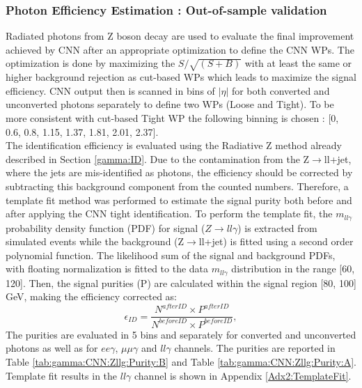 
\subsubsection{Photon Efficiency Estimation : Out-of-sample validation}
\label{gamma:CNN:Zllg}
Radiated photons from Z boson decay are used to evaluate the final improvement achieved by CNN after an appropriate optimization to define the CNN WPs. The optimization is done by maximizing the $S/\sqrt{(S+B)}$ with at least the same or higher background rejection as cut-based WPs which leads to maximize the signal efficiency. CNN output then is scanned in bins of $|\eta|$ for both converted and unconverted photons separately to define two WPs (Loose and Tight). To be more consistent with cut-based Tight WP the following binning is chosen : [0, 0.6, 0.8, 1.15, 1.37, 1.81, 2.01, 2.37]. \\
The identification efficiency is evaluated using the Radiative Z method already described in Section \ref{gamma:ID}. Due to the contamination from the Z$\rightarrow$ll+jet, where the jets are mis-identified as photons, the efficiency should be corrected by subtracting this background component from the counted numbers. Therefore, a template fit method was performed to estimate the signal purity both before and after applying the CNN tight identification. To perform the template fit, the $m_{ll\gamma}$ probability density function (PDF) for signal ($Z\rightarrow ll\gamma$) is extracted from simulated events while the background (Z$\rightarrow$ll+jet) is fitted using a second order polynomial function. The likelihood sum of the signal and background PDFs, with floating normalization is fitted to the data $m_{ll\gamma}$ distribution in the range [60, 120]. Then, the signal purities (P) are calculated within the signal region [80, 100] GeV, making the efficiency corrected as:
\begin{equation}
    \epsilon_{ID} = \frac{N^{after ID}\times P^{after ID}}{N^{before ID} \times P^{before ID}},
\end{equation}
The purities are evaluated in 5 \pT bins and separately for converted and unconverted photons as well as for $ee\gamma$, $\mu\mu\gamma$ and $ll\gamma$ channels. The purities are reported in Table \ref{tab:gamma:CNN:Zllg:Purity:B} and Table \ref{tab:gamma:CNN:Zllg:Purity:A}. Template fit results in the $ll\gamma$ channel is shown in Appendix \ref{Adx2:TemplateFit}.

